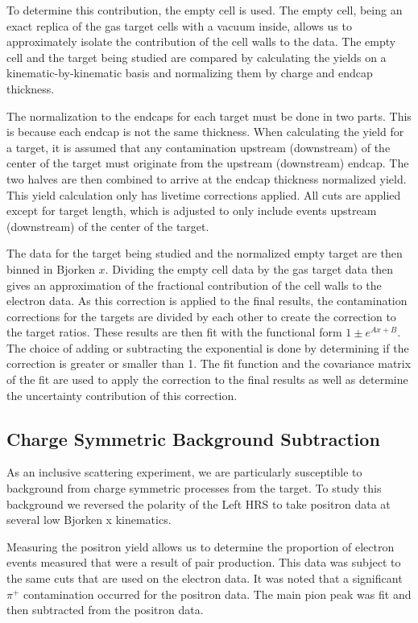 To determine this contribution, the empty cell is used. The empty cell, being an exact replica of the gas target cells with a vacuum inside, allows us to approximately isolate the contribution of the cell walls to the data. The empty cell and the target being studied are compared by calculating the yields on a kinematic-by-kinematic basis and normalizing them by charge and endcap thickness.

The normalization to the endcaps for each target must be done in two parts. This is because each endcap is not the same thickness. When calculating the yield for a target, it is assumed that any contamination upstream (downstream) of the center of the target must originate from the upstream (downstream) endcap. The two halves are then combined to arrive at the endcap thickness normalized yield. This yield calculation only has livetime corrections applied. All cuts are applied except for target length, which is adjusted to only include events upstream (downstream) of the center of the target.

The data for the target being studied and the normalized empty target are then binned in Bjorken $x$. Dividing the empty cell data by the gas target data then gives an approximation of the fractional contribution of the cell walls to the electron data. As this correction is applied to the final results, the contamination corrections for the targets are divided by each other to create the correction to the target ratios. These results are then fit with the functional form $1\pm e^{Ax+B}$. The choice of adding or subtracting the exponential is done by determining if the correction is greater or smaller than 1. The fit function and the covariance matrix of the fit are used to apply the correction to the final results as well as determine the uncertainty contribution of this correction.

\subsection{Charge Symmetric Background Subtraction}

As an inclusive scattering experiment, we are particularly susceptible to background from charge symmetric processes from the target. To study this background we reversed the polarity of the Left HRS to take positron data at several low Bjorken x kinematics.

Measuring the positron yield allows us to determine the proportion of electron events measured that were a result of pair production. This data was subject to the same cuts that are used on the electron data. It was noted that a significant $\pi^+$ contamination occurred for the positron data. The main pion peak was fit and then subtracted from the positron data.

